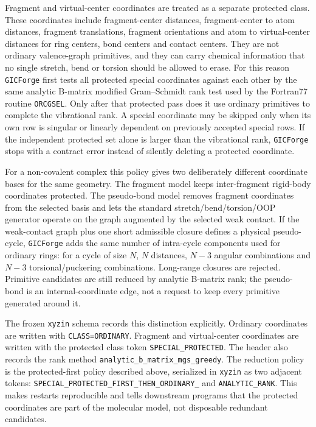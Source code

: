 \documentclass[11pt]{article}
\newcommand{\program}{\texttt{GICForge}}
\newcommand{\xyzin}{\texttt{xyzin}}
\begin{document}
Fragment and virtual-center coordinates are treated as a separate protected
class.  These coordinates include fragment-center distances, fragment-center to
atom distances, fragment translations, fragment orientations and atom to
virtual-center distances for ring centers, bond centers and contact centers.
They are not ordinary valence-graph primitives, and they can carry chemical
information that no single stretch, bend or torsion should be allowed to erase.
For this reason \program{} first tests all protected special coordinates
against each other by the same analytic B-matrix modified Gram--Schmidt rank
test used by the Fortran77 routine \texttt{ORCGSEL}.  Only after that protected
pass does it use ordinary primitives to complete the vibrational rank.  A
special coordinate may be skipped only when its own row is singular or linearly
dependent on previously accepted special rows.  If the independent protected
set alone is larger than the vibrational rank, \program{} stops with a contract
error instead of silently deleting a protected coordinate.

For a non-covalent complex this policy gives two deliberately different
coordinate bases for the same geometry.  The fragment model keeps
inter-fragment rigid-body coordinates protected.  The pseudo-bond model removes
fragment coordinates from the selected basis and lets the standard
stretch/bend/torsion/OOP generator operate on the graph augmented by the
selected weak contact.  If the weak-contact graph plus one short admissible
closure defines a physical pseudo-cycle, \program{} adds the same number of
intra-cycle components used for ordinary rings: for a cycle of size \(N\), \(N\)
distances, \(N-3\) angular combinations and \(N-3\) torsional/puckering
combinations.  Long-range closures are rejected.  Primitive candidates are
still reduced by analytic B-matrix rank; the pseudo-bond is an
internal-coordinate edge, not a request to keep every primitive generated around
it.

The frozen \xyzin{} schema records this distinction explicitly.  Ordinary
coordinates are written with \texttt{CLASS=ORDINARY}.  Fragment and
virtual-center coordinates are written with the protected class token
\texttt{SPECIAL\_PROTECTED}.  The header also records the rank method
\texttt{analytic\_b\_matrix\_mgs\_greedy}.  The reduction policy is the
protected-first policy described above, serialized in \xyzin{} as
two adjacent tokens:
\texttt{SPECIAL\_PROTECTED\_FIRST\_THEN\_ORDINARY\_} and
\texttt{ANALYTIC\_RANK}.
This makes restarts reproducible and tells downstream programs that the
protected coordinates are part of the molecular model, not disposable
redundant candidates.
\end{document}
